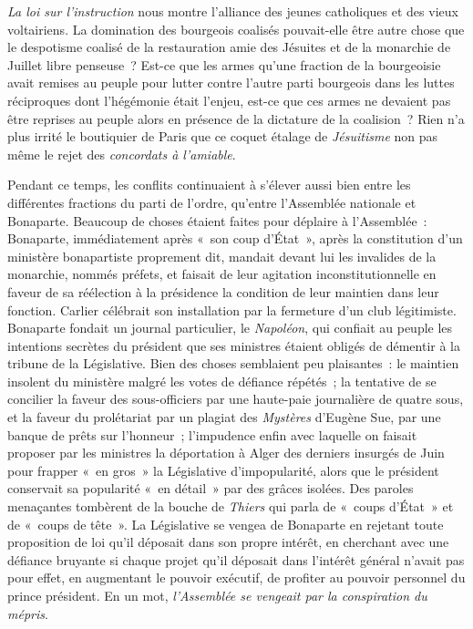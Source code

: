 \documentclass[french,twoside]{book} %
\begin{document}
\emph{La loi sur l’instruction} nous montre l’alliance des jeunes catholiques et des vieux voltairiens. La domination des bourgeois coalisés pouvait-elle être autre chose que le despotisme coalisé de la restauration amie des Jésuites et de la monarchie de Juillet libre penseuse ? Est-ce que les armes qu’une fraction de la bourgeoisie avait remises au peuple pour lutter contre l’autre parti bourgeois dans les luttes réciproques dont l’hégémonie était l’enjeu, est-ce que ces armes ne devaient pas être reprises au peuple alors en présence de la dictature de la coalision ? Rien n’a plus irrité le boutiquier de Paris que ce coquet étalage de \emph{Jésuitisme} non pas même le rejet des \emph{concordats à l’amiable}.\par
Pendant ce temps, les conflits continuaient à s’élever aussi bien entre les différentes fractions du parti de l’ordre, qu’entre l’Assemblée nationale et Bonaparte. Beaucoup de choses étaient faites pour déplaire à l’Assemblée : Bonaparte, immédiatement après « son coup d’État », après la constitution d’un ministère bonapartiste proprement dit, mandait devant lui les invalides de la monarchie, nommés préfets, et faisait de leur agitation inconstitutionnelle en faveur de sa réélection à la présidence la condition de leur maintien dans leur fonction. Carlier célébrait son installation par la fermeture d’un club légitimiste. Bonaparte fondait un journal particulier, le \emph{Napoléon}, qui confiait au peuple les intentions secrètes du président que ses ministres étaient obligés de démentir à la tribune de la Législative. Bien des choses semblaient peu plaisantes : le maintien insolent du ministère malgré les votes de défiance répétés ; la tentative de se concilier la faveur des sous-officiers par une haute-paie journalière de quatre sous, et la faveur du prolétariat par un plagiat des \emph{Mystères} d’Eugène Sue, par une banque de prêts sur l’honneur ; l’impudence enfin avec laquelle on faisait proposer par les ministres la déportation à Alger des derniers insurgés de Juin pour frapper « en gros » la Législative d’impopularité, alors que le président conservait sa popularité « en détail » par des grâces isolées. Des paroles menaçantes tombèrent de la bouche de \emph{Thiers} qui parla de « coups d’État » et de « coups de tête ». La Législative se vengea de Bonaparte en rejetant toute proposition de loi qu’il déposait dans son propre intérêt, en cherchant avec une défiance bruyante si chaque projet qu’il déposait dans l’intérêt général n’avait pas pour effet, en augmentant le pouvoir exécutif, de profiter au pouvoir personnel du prince président. En un mot, \emph{l’Assemblée se vengeait par la conspiration du mépris}.\par
\end{document}
